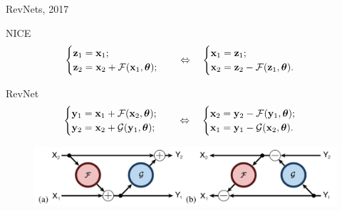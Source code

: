 \begin{frame}{RevNets, 2017}
	\begin{block}{NICE}
		\vspace{-0.2cm}
		\begin{equation*}
			\begin{cases} \mathbf{z}_1 = \mathbf{x}_1; \\ \mathbf{z}_2 = \mathbf{x}_2 + \mathcal{F}(\mathbf{x}_1, \boldsymbol{\theta});\end{cases}  \quad \Leftrightarrow \quad 
			\begin{cases} \mathbf{x}_1 = \mathbf{z}_1; \\ \mathbf{x}_2 = \mathbf{z}_2 - \mathcal{F}(\mathbf{z}_1, \boldsymbol{\theta}).\end{cases} 
		\end{equation*}
		\vspace{-0.2cm}
	\end{block}
	\begin{block}{RevNet}
		\begin{equation*}
			\begin{cases} \mathbf{y}_1 = \mathbf{x}_1 + \mathcal{F}(\mathbf{x}_2, \boldsymbol{\theta}); \\ \mathbf{y}_2 = \mathbf{x}_2 + \mathcal{G}(\mathbf{y}_1, \boldsymbol{\theta});\end{cases} \quad \Leftrightarrow \quad 
			\begin{cases} \mathbf{x}_2 = \mathbf{y}_2 - \mathcal{F}(\mathbf{y}_1, \boldsymbol{\theta}); \\ \mathbf{x}_1 = \mathbf{y}_1 - \mathcal{G}(\mathbf{x}_2, \boldsymbol{\theta}).\end{cases} 
		\end{equation*}
	\end{block}
	\begin{figure}
		\centering
		\includegraphics[width=\linewidth]{figs/revnet.png}
	\end{figure}
\end{frame}

